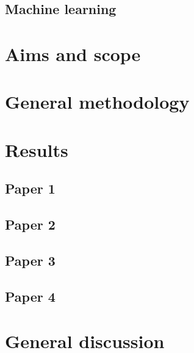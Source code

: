 \documentclass{book}
\begin{document}
    \section{Machine learning}
    \label{theory:ml}
     
    
\chapter{Aims and scope}
\label{chap:aims_scope}


\chapter{General methodology}
\label{chap:methods}


\chapter{Results}
\label{chap:results}
    \section{Paper 1}
    \label{results:paper1}

    \section{Paper 2}
    \label{results:paper2}

    \section{Paper 3}
    \label{results:paper3}

    \section{Paper 4}
    \label{results:paper4}
    
\chapter{General discussion}
\label{chap:discussion}

\printbibliography
\end{document}
